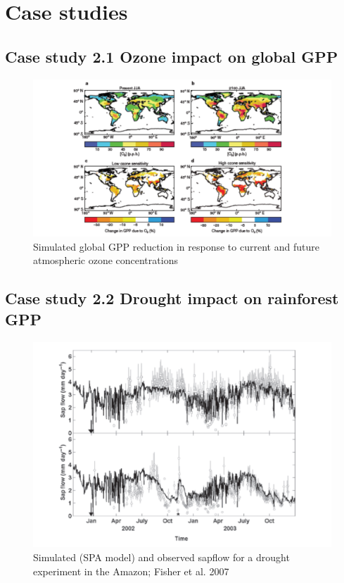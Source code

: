 \documentclass[12pt,oneside]{book}
\begin{document}
\section{Case studies}\label{case-studies}

\subsection{Case study 2.1 Ozone impact on global
GPP}\label{case-study-2.1-ozone-impact-on-global-gpp}

\begin{figure}

{\centering \includegraphics[width=0.8\linewidth]{figures/chap2/ozone} 

}

\caption{Simulated global GPP reduction in response to current and future atmospheric ozone concentrations}\label{fig:f223}
\end{figure}

\subsection{Case study 2.2 Drought impact on rainforest
GPP}\label{case-study-2.2-drought-impact-on-rainforest-gpp}

\begin{figure}

{\centering \includegraphics[width=0.8\linewidth]{figures/chap2/fisher1} 

}

\caption{Simulated (SPA model) and observed sapflow for a drought experiment in the Amazon; Fisher et al. 2007}\label{fig:f224}
\end{figure}
\end{document}
